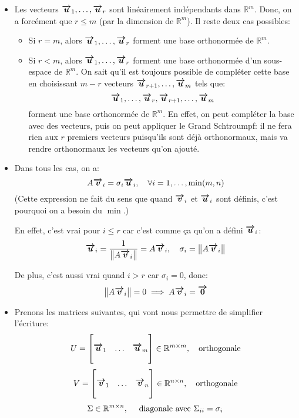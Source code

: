 \documentclass[a4paper]{article}
\begin{document}
{\begin{itemize}[left=0pt]
    Les vecteurs $\bvec{u}_1, \ldots, \bvec{u}_r$ sont orthonormés dans $\mathbb{R}^m$ car ils sont orthogonaux (on a démontré que $\left(A \bvec{v}_i\right) \dotprod \left(A \bvec{v}_j\right) = 0$ quand $i \neq j$) et car ils sont de norme égale à 1.
    \item Les vecteurs $\bvec{u}_1, \ldots, \bvec{u}_r$ sont linéairement indépendants dans $\mathbb{R}^m$. Donc, on a forcément que $r \leq m$ (par la dimension de $\mathbb{R}^m$). Il reste deux cas possibles:
        \begin{itemize}
            \item Si $r = m$, alors $\bvec{u}_1, \ldots, \bvec{u}_r$ forment une base orthonormée de $\mathbb{R}^m$.
            \item Si $r < m$, alors $\bvec{u}_1, \ldots, \bvec{u}_r$ forment une base orthonormée d'un sous-espace de $\mathbb{R}^m$. On sait qu'il est toujours possible de compléter cette base en choisissant $m - r$ vecteurs $\bm{\protect\overrightarrow{u}}_{r+1}, \ldots, \bm{\protect\overrightarrow{u}}_m$ tels que: 
            \[\bm{\protect\overrightarrow{u}}_1, \ldots, \bm{\protect\overrightarrow{u}}_r, \bm{\protect\overrightarrow{u}}_{r+1}, \ldots, \bm{\protect\overrightarrow{u}}_m\]
            forment une base orthonormée de $\mathbb{R}^m$. En effet, on peut compléter la base avec des vecteurs, puis on peut appliquer le Grand Schtroumpf: il ne fera rien aux $r$ premiers vecteurs puisqu'ils sont déjà orthonormaux, mais va rendre orthonormaux les vecteurs qu'on ajouté.
        \end{itemize}
        
    \item Dans tous les cas, on a: 
    \[A \bvec{v}_i = \sigma_i \bvec{u}_i, \mathspace \forall i = 1, \ldots, \min\left(m, n\right)\]
    (Cette expression ne fait du sens que quand $\bm{\protect\overrightarrow{v}}_i$ et $\bm{\protect\overrightarrow{u}}_i$ sont définis, c'est pourquoi on a besoin du $\min$.)

    En effet, c'est vrai pour $i \leq r$ car c'est comme ça qu'on a défini $\bm{\protect\overrightarrow{u}}_i$: 
    \[\bvec{u}_i = \frac{1}{\left\|A \bvec{v}_i\right\|} = A \bvec{v}_i, \mathspace \sigma_i = \left\| A \bvec{v}_i\right\|\]

    De plus, c'est aussi vrai quand $i > r$ car $\sigma_i = 0$, donc: 
    \[\left\|A \bvec{v}_i\right\| = 0 \implies A \bvec{v}_i = \bvec{0}\]
    
    
    \item Prenons les matrices suivantes, qui vont nous permettre de simplifier l'écriture:
    \[U = \begin{bmatrix}  &  &  \\ \bm{\protect\overrightarrow{u}}_1 & \ldots & \bm{\protect\overrightarrow{u}}_m \\  &  &  \end{bmatrix} \in \mathbb{R}^{m \times m}, \quad \text{orthogonale}\]
    \[V = \begin{bmatrix}  &  &  \\ \bm{\protect\overrightarrow{v}}_1 & \ldots & \bm{\protect\overrightarrow{v}}_n \\  &  &  \end{bmatrix} \in \mathbb{R}^{n \times n}, \quad \text{orthogonale}\]
    \[\Sigma \in \mathbb{R}^{m \times n}, \quad \text{ diagonale avec } \Sigma_{ii} = \sigma_i\]


\end{itemize}}
\end{document}
